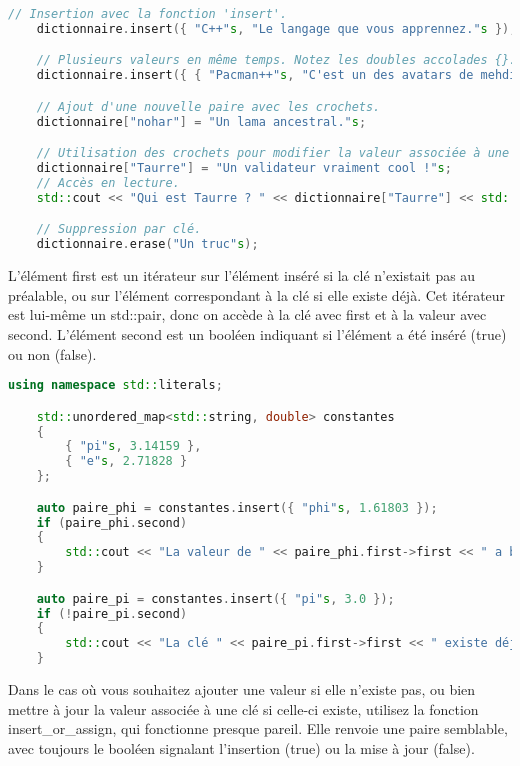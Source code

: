 \documentclass{article}
\begin{document}
\begin{itemize}
\begin{lstlisting}[language=C++]
\end{lstlisting}{}

\begin{lstlisting}[language=C++]
    // Insertion avec la fonction 'insert'.
    dictionnaire.insert({ "C++"s, "Le langage que vous apprennez."s });

    // Plusieurs valeurs en même temps. Notez les doubles accolades {}.
    dictionnaire.insert({ { "Pacman++"s, "C'est un des avatars de mehdidou99."s }, { "Un truc"s, "Personne ne sait ce que c'est."s } });

    // Ajout d'une nouvelle paire avec les crochets.
    dictionnaire["nohar"] = "Un lama ancestral."s;

    // Utilisation des crochets pour modifier la valeur associée à une clé existante.
    dictionnaire["Taurre"] = "Un validateur vraiment cool !"s;
    // Accès en lecture.
    std::cout << "Qui est Taurre ? " << dictionnaire["Taurre"] << std::endl << std::endl;

    // Suppression par clé.
    dictionnaire.erase("Un truc"s);
\end{lstlisting}{}

L’élément first est un itérateur sur l’élément inséré si la clé n’existait pas au préalable, ou sur l’élément correspondant à la clé si elle existe déjà. Cet itérateur est lui-même un std::pair, donc on accède à la clé avec first et à la valeur avec second.
L’élément second est un booléen indiquant si l’élément a été inséré (true) ou non (false).

\begin{lstlisting}[language=C++]
    using namespace std::literals;

    std::unordered_map<std::string, double> constantes
    {
        { "pi"s, 3.14159 },
        { "e"s, 2.71828 }
    };

    auto paire_phi = constantes.insert({ "phi"s, 1.61803 });
    if (paire_phi.second)
    {
        std::cout << "La valeur de " << paire_phi.first->first << " a bien été ajoutée." << std::endl;
    }

    auto paire_pi = constantes.insert({ "pi"s, 3.0 });
    if (!paire_pi.second)
    {
        std::cout << "La clé " << paire_pi.first->first << " existe déjà et vaut " << paire_pi.first->second << "." << std::endl;
    }
\end{lstlisting}{}

Dans le cas où vous souhaitez ajouter une valeur si elle n’existe pas, ou bien mettre à jour la valeur associée à une clé si celle-ci existe, utilisez la fonction insert\_or\_assign, qui fonctionne presque pareil. Elle renvoie une paire semblable, avec toujours le booléen signalant l’insertion (true) ou la mise à jour (false).



\end{itemize}
\end{document}

